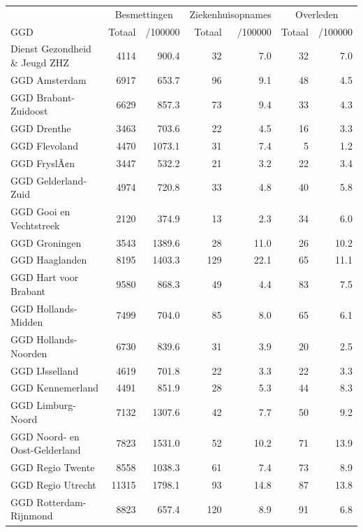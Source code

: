 \documentclass[
  english,
  man,floatsintext]{apa6}
\begin{document}
\begin{table}[H]
\centering\begingroup\fontsize{10}{12}\selectfont

\begin{threeparttable}
\begin{tabular}{lrrrrrr}
\toprule
\multicolumn{1}{c}{ } & \multicolumn{2}{c}{Besmettingen} & \multicolumn{2}{c}{Ziekenhuisopnames} & \multicolumn{2}{c}{Overleden} \\
\cmidrule(l{3pt}r{3pt}){2-3} \cmidrule(l{3pt}r{3pt}){4-5} \cmidrule(l{3pt}r{3pt}){6-7}
GGD & Totaal & /100000 & Totaal & /100000 & Totaal & /100000\\
\midrule
Dienst Gezondheid \& Jeugd ZHZ & 4114 & 900.4 & 32 & 7.0 & 32 & 7.0\\
GGD Amsterdam & 6917 & 653.7 & 96 & 9.1 & 48 & 4.5\\
GGD Brabant-Zuidoost & 6629 & 857.3 & 73 & 9.4 & 33 & 4.3\\
GGD Drenthe & 3463 & 703.6 & 22 & 4.5 & 16 & 3.3\\
GGD Flevoland & 4470 & 1073.1 & 31 & 7.4 & 5 & 1.2\\
GGD FryslÃ¢n & 3447 & 532.2 & 21 & 3.2 & 22 & 3.4\\
GGD Gelderland-Zuid & 4974 & 720.8 & 33 & 4.8 & 40 & 5.8\\
GGD Gooi en Vechtstreek & 2120 & 374.9 & 13 & 2.3 & 34 & 6.0\\
GGD Groningen & 3543 & 1389.6 & 28 & 11.0 & 26 & 10.2\\
GGD Haaglanden & 8195 & 1403.3 & 129 & 22.1 & 65 & 11.1\\
GGD Hart voor Brabant & 9580 & 868.3 & 49 & 4.4 & 83 & 7.5\\
GGD Hollands-Midden & 7499 & 704.0 & 85 & 8.0 & 65 & 6.1\\
GGD Hollands-Noorden & 6730 & 839.6 & 31 & 3.9 & 20 & 2.5\\
GGD IJsselland & 4619 & 701.8 & 22 & 3.3 & 22 & 3.3\\
GGD Kennemerland & 4491 & 851.9 & 28 & 5.3 & 44 & 8.3\\
GGD Limburg-Noord & 7132 & 1307.6 & 42 & 7.7 & 50 & 9.2\\
GGD Noord- en Oost-Gelderland & 7823 & 1531.0 & 52 & 10.2 & 71 & 13.9\\
GGD Regio Twente & 8558 & 1038.3 & 61 & 7.4 & 73 & 8.9\\
GGD Regio Utrecht & 11315 & 1798.1 & 93 & 14.8 & 87 & 13.8\\
GGD Rotterdam-Rijnmond & 8823 & 657.4 & 120 & 8.9 & 91 & 6.8\\

\end{tabular}
\end{threeparttable}
\end{table}
\end{document}

